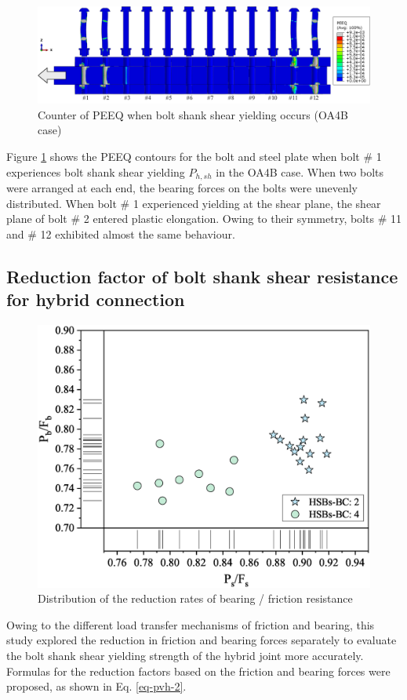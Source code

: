 \begin{figure}
    \centering
    \includegraphics[width=0.9\linewidth]{imgs/ch7/beadist.pdf}
    \caption{Counter of PEEQ when bolt shank shear yielding occurs (OA4B case)}
    \label{fig-bsh}
\end{figure}


Figure \ref{fig-bsh} shows the PEEQ contours for the bolt and steel plate when bolt \# 1 experiences bolt shank shear yielding $P_{h,sh}$ in the OA4B case. When two bolts were arranged at each end, the bearing forces on the bolts were unevenly distributed. When bolt \# 1 experienced yielding at the shear plane, the shear plane of bolt \# 2 entered plastic elongation. Owing to their symmetry, bolts \# 11 and \# 12 exhibited almost the same behaviour.

\subsection{Reduction factor of bolt shank shear resistance for hybrid connection}



\begin{figure}[htbp]
    \centering
    \includegraphics[width=0.65\linewidth]{imgs/ch7/RF-pspb.eps}
    \caption{Distribution of the reduction rates of bearing / friction resistance}
    \label{fig-dist-RF}
\end{figure}

Owing to the different load transfer mechanisms of friction and bearing, this study explored the reduction in friction and bearing forces separately to evaluate the bolt shank shear yielding strength of the hybrid joint more accurately. Formulas for the reduction factors based on the friction and bearing forces were proposed, as shown in Eq. \ref{eq-pvh-2}. 

